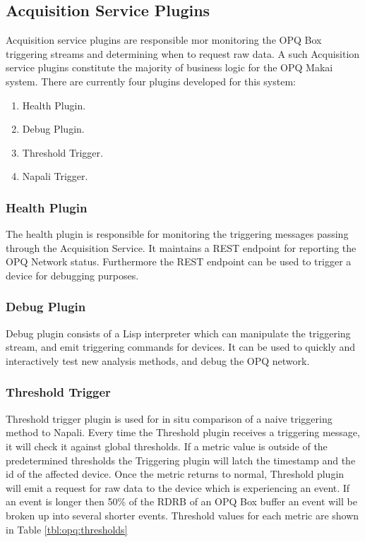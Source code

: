\subsection{Acquisition Service Plugins}\label{subsec:acquisition-service-plugins}

Acquisition service plugins are responsible mor monitoring the OPQ Box triggering streams and determining when to request raw data.
A such Acquisition service plugins constitute the majority of business logic for the OPQ Makai system.
There are currently four plugins developed for this system:
\begin{enumerate}
	\item Health Plugin.
	\item Debug Plugin.
	\item Threshold Trigger.
	\item Napali Trigger.
\end{enumerate}

\subsubsection{Health Plugin}

The health plugin is responsible for monitoring the triggering messages passing through the Acquisition Service.
It maintains a REST endpoint for reporting the OPQ Network status.
Furthermore the REST endpoint can be used to trigger a device for debugging purposes.

\subsubsection{Debug Plugin}
Debug plugin consists of a Lisp interpreter which can manipulate the triggering stream, and emit triggering commands for devices.
It can be used to quickly and interactively test new analysis methods, and debug the OPQ network.

\subsubsection{Threshold Trigger}
Threshold trigger plugin is used for in situ comparison of a naive triggering method to Napali.
Every time the Threshold plugin receives a triggering message, it will check it against global thresholds.
If a metric value is outside of the predetermined thresholds the Triggering plugin will latch the timestamp and the id of the affected device.
Once the metric returns to normal, Threshold plugin will emit a request for raw data to the device which is experiencing an event.
If an event is longer then 50\% of the RDRB of an OPQ Box buffer an event will be broken up into several shorter events.
Threshold values for each metric are shown in Table \ref{tbl:opq:thresholds}

